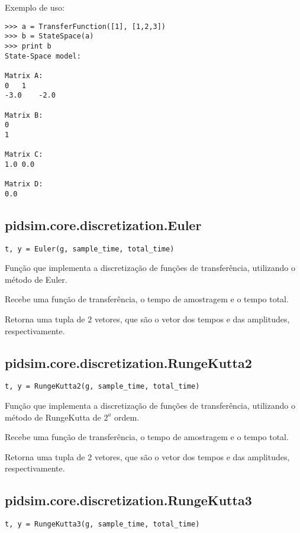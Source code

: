     Exemplo de uso:
    
    \begin{verbatim}
>>> a = TransferFunction([1], [1,2,3])
>>> b = StateSpace(a)
>>> print b
State-Space model:

Matrix A:
0   1   
-3.0    -2.0    

Matrix B:
0   
1   

Matrix C:
1.0 0.0 

Matrix D:
0.0\end{verbatim}

\subsection{pidsim.core.discretization.Euler}

    \begin{verbatim}
t, y = Euler(g, sample_time, total_time)\end{verbatim}

    Função que implementa a discretização de funções de transferência,
    utilizando o método de Euler.
    
    Recebe uma função de transferência, o tempo de amostragem e o tempo
    total.

    Retorna uma tupla de 2 vetores, que são o vetor dos tempos e das amplitudes,
    respectivamente.

\subsection{pidsim.core.discretization.RungeKutta2}

    \begin{verbatim}
t, y = RungeKutta2(g, sample_time, total_time)\end{verbatim}
    
    Função que implementa a discretização de funções de transferência,
    utilizando o método de RungeKutta de $2^a$ ordem.
    
    Recebe uma função de transferência, o tempo de amostragem e o tempo
    total.
    
    Retorna uma tupla de 2 vetores, que são o vetor dos tempos e das amplitudes,
    respectivamente.

\subsection{pidsim.core.discretization.RungeKutta3}

    \begin{verbatim}
t, y = RungeKutta3(g, sample_time, total_time)\end{verbatim}
    
